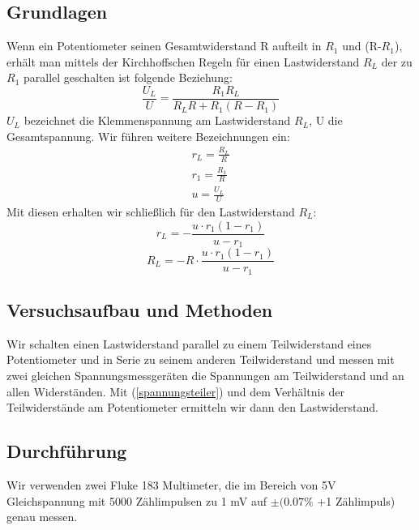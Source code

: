 \documentclass{article}
\begin{document}
\subsection{Grundlagen}
Wenn ein Potentiometer seinen Gesamtwiderstand R aufteilt in $R_1$ und (R-$R_1$), erhält man mittels der Kirchhoffschen Regeln für einen Lastwiderstand $R_L$ der zu $R_1$ parallel geschalten ist folgende Beziehung: 
\begin{equation}
\label{spannungsteiler}
\frac{U_L}{U}=\frac{R_1R_L}{R_LR+R_1(R-R_1)}
\end{equation}
$U_L$ bezeichnet die Klemmenspannung am Lastwiderstand $R_L$, U die Gesamtspannung. Wir führen weitere Bezeichnungen ein:
\begin{align*}
r_L=\frac{R_L}{R} \\
r_1=\frac{R_1}{R} \\
u = \frac{U_L}{U}
\end{align*}
Mit diesen erhalten wir schließlich für den Lastwiderstand $R_L$:
\begin{equation*}
r_L=-\frac{u\cdot r_1(1-r_1)}{u-r_1}
\end{equation*}
\begin{equation}
\label{spannungsteiler_umgeformt}
R_L=-R\cdot \frac{u\cdot r_1(1-r_1)}{u-r_1}
\end{equation}

\subsection{Versuchsaufbau und Methoden}
Wir schalten einen Lastwiderstand parallel zu einem Teilwiderstand eines Potentiometer und in Serie zu seinem anderen Teilwiderstand und messen mit zwei gleichen Spannungsmessgeräten die Spannungen am Teilwiderstand und an allen Widerständen. Mit (\ref{spannungsteiler}) und dem Verhältnis der Teilwiderstände am Potentiometer ermitteln wir dann den Lastwiderstand. 
\subsection{Durchführung}
Wir verwenden zwei Fluke 183 Multimeter, die im Bereich von 5V Gleichspannung mit 5000 Zählimpulsen zu 1 mV auf $\pm (0.07\%$ +1 Zählimpuls) genau messen.
\end{document}
